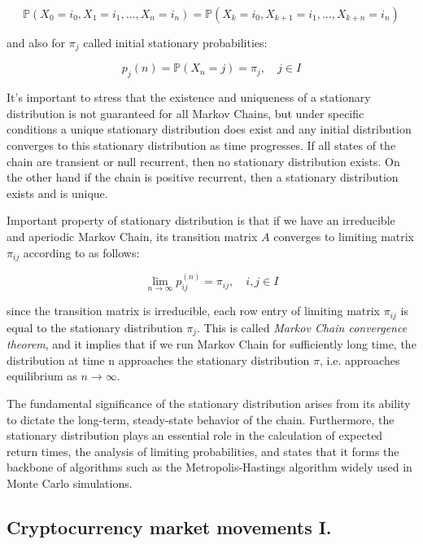 \begin{equation}
    \mathbb{P}(X_0=i_0,X_1=i_1,\ldots,X_n=i_n) = \mathbb{P}(X_k=i_0,X_{k+1}=i_1,\ldots,X_{k+n}=i_n)
\end{equation}

and also for $\pi_j$ called initial stationary probabilities:

\begin{equation} \label{eq:init_stationary}
    p_j(n) = \mathbb{P}(X_n = j) = \pi_j, \quad j \in I
\end{equation}

It's important to stress that the existence and uniqueness of a stationary distribution 
is not guaranteed for all Markov Chains, but under specific conditions a unique stationary 
distribution does exist and any initial distribution converges to this stationary distribution \cite{Praskova2012} as time progresses.
If all states of the chain are transient or null recurrent, then no stationary distribution exists. On the other hand if the chain is
positive recurrent, then a stationary distribution exists and is unique.

Important property of stationary distribution is that if we have an irreducible and aperiodic Markov Chain, its transition matrix $A$ converges to limiting matrix $\pi_{ij}$ according to \cite{Haggstrom2002} as follows:

\begin{equation}
    \lim_{n \to \infty} p_{ij}^{(n)} = \pi_{ij}, \quad i,j \in I
\end{equation}

since the transition matrix is irreducible, each row entry of limiting matrix $\pi_{ij}$ is equal to the stationary distribution $\pi_j$. This is called \textit{Markov Chain convergence theorem}, and it implies that if we run 
Markov Chain for sufficiently long time, the distribution at time n approaches the stationary distribution $\pi$, i.e. approaches equilibrium as $n \to \infty$.
 
The fundamental significance of the stationary distribution arises from its ability to dictate the long-term, 
steady-state behavior of the chain. Furthermore, the stationary distribution plays an essential role in the 
calculation of expected return times, the analysis of limiting probabilities, and \cite{Navarro2011} states that it forms the backbone of
algorithms such as the Metropolis-Hastings algorithm widely used in Monte Carlo simulations.

\subsection{Cryptocurrency market movements I.}

